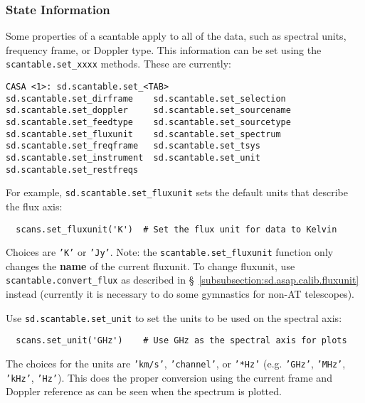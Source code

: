 \subsubsection{State Information}
\label{subsubsection:sd.asap.scantable.state}

Some properties of a scantable apply to all of the data, such as
spectral units, frequency frame, or Doppler type. This
information can be set using the %
{\tt scantable.set\_xxxx}
methods.  These are currently:
\small
\begin{verbatim}
CASA <1>: sd.scantable.set_<TAB>
sd.scantable.set_dirframe    sd.scantable.set_selection
sd.scantable.set_doppler     sd.scantable.set_sourcename
sd.scantable.set_feedtype    sd.scantable.set_sourcetype
sd.scantable.set_fluxunit    sd.scantable.set_spectrum
sd.scantable.set_freqframe   sd.scantable.set_tsys
sd.scantable.set_instrument  sd.scantable.set_unit
sd.scantable.set_restfreqs   
\end{verbatim}
\normalsize

For example, {\tt sd.scantable.set\_fluxunit} sets the default units
that describe the flux axis:
\small
\begin{verbatim}
  scans.set_fluxunit('K')  # Set the flux unit for data to Kelvin
\end{verbatim}
\normalsize
Choices are {\tt 'K'} or {\tt 'Jy'}.
Note: the {\tt scantable.set\_fluxunit} function only changes the {\bf name}
of the current fluxunit. To change fluxunit, use 
{\tt scantable.convert\_flux} as described in 
\S~\ref{subsubsection:sd.asap.calib.fluxunit}
instead (currently it is necessary to do some gymnastics for non-AT
telescopes).

Use {\tt sd.scantable.set\_unit} to set the units to be used on 
the spectral axis:
\small
\begin{verbatim}
  scans.set_unit('GHz')    # Use GHz as the spectral axis for plots
\end{verbatim}
\normalsize
The choices for the units are {\tt 'km/s'}, {\tt 'channel'}, or
{\tt '*Hz'} (e.g. {\tt 'GHz'}, {\tt 'MHz'}, {\tt 'kHz'}, {\tt 'Hz'}).
This does the proper conversion using the current frame and Doppler
reference as can be seen when the spectrum is plotted.

